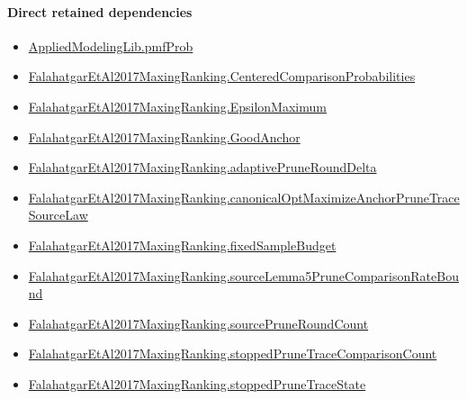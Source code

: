 \documentclass[10pt]{article}
\begin{document}
\paragraph{Direct retained dependencies}
\begin{itemize}\raggedright
\item \hyperlink{governing-declaration-9c38d53b9d664221}{Applied\allowbreak{}Modeling\allowbreak{}Lib.\allowbreak{}pmf\allowbreak{}Prob}
\item \hyperlink{paper-prerequisite-b99b697ef57f53ce}{Falahatgar\allowbreak{}Et\allowbreak{}Al2017\allowbreak{}Maxing\allowbreak{}Ranking.\allowbreak{}Centered\allowbreak{}Comparison\allowbreak{}Probabilities}
\item \hyperlink{paper-prerequisite-f40acf814741691d}{Falahatgar\allowbreak{}Et\allowbreak{}Al2017\allowbreak{}Maxing\allowbreak{}Ranking.\allowbreak{}Epsilon\allowbreak{}Maximum}
\item \hyperlink{paper-prerequisite-46128be8e1edb4b6}{Falahatgar\allowbreak{}Et\allowbreak{}Al2017\allowbreak{}Maxing\allowbreak{}Ranking.\allowbreak{}Good\allowbreak{}Anchor}
\item \hyperlink{governing-declaration-0a2d9c4ad2e46f08}{Falahatgar\allowbreak{}Et\allowbreak{}Al2017\allowbreak{}Maxing\allowbreak{}Ranking.\allowbreak{}adaptive\allowbreak{}Prune\allowbreak{}Round\allowbreak{}Delta}
\item \hyperlink{governing-declaration-e9c7b45ee4c975cd}{Falahatgar\allowbreak{}Et\allowbreak{}Al2017\allowbreak{}Maxing\allowbreak{}Ranking.\allowbreak{}canonical\allowbreak{}Opt\allowbreak{}Maximize\allowbreak{}Anchor\allowbreak{}Prune\allowbreak{}Trace\allowbreak{}Source\allowbreak{}Law}
\item \hyperlink{governing-declaration-4b4daf4bb2493573}{Falahatgar\allowbreak{}Et\allowbreak{}Al2017\allowbreak{}Maxing\allowbreak{}Ranking.\allowbreak{}fixed\allowbreak{}Sample\allowbreak{}Budget}
\item \hyperlink{governing-declaration-dac2c682a1bccd41}{Falahatgar\allowbreak{}Et\allowbreak{}Al2017\allowbreak{}Maxing\allowbreak{}Ranking.\allowbreak{}source\allowbreak{}Lemma5\allowbreak{}Prune\allowbreak{}Comparison\allowbreak{}Rate\allowbreak{}Bound}
\item \hyperlink{governing-declaration-7a4a97da03826b66}{Falahatgar\allowbreak{}Et\allowbreak{}Al2017\allowbreak{}Maxing\allowbreak{}Ranking.\allowbreak{}source\allowbreak{}Prune\allowbreak{}Round\allowbreak{}Count}
\item \hyperlink{governing-declaration-35a38588d49521f4}{Falahatgar\allowbreak{}Et\allowbreak{}Al2017\allowbreak{}Maxing\allowbreak{}Ranking.\allowbreak{}stopped\allowbreak{}Prune\allowbreak{}Trace\allowbreak{}Comparison\allowbreak{}Count}
\item \hyperlink{governing-declaration-bb5991f407529737}{Falahatgar\allowbreak{}Et\allowbreak{}Al2017\allowbreak{}Maxing\allowbreak{}Ranking.\allowbreak{}stopped\allowbreak{}Prune\allowbreak{}Trace\allowbreak{}State}
\end{itemize}
\hypertarget{governing-declaration-2ee65ec9ca789fc8}{}
\end{document}
